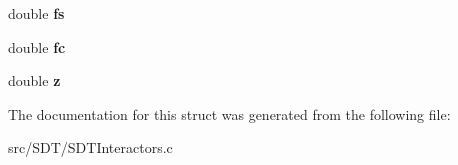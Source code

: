 \begin{DoxyCompactItemize}
\item 
\hypertarget{struct_s_d_t_friction_ac0c69854be0f25918d8cfaaa932feda9}{}double {\bfseries fs}\label{struct_s_d_t_friction_ac0c69854be0f25918d8cfaaa932feda9}

\item 
\hypertarget{struct_s_d_t_friction_a689f18157c425f52c5028d408c365616}{}double {\bfseries fc}\label{struct_s_d_t_friction_a689f18157c425f52c5028d408c365616}

\item 
\hypertarget{struct_s_d_t_friction_ab3e6ed577a7c669c19de1f9c1b46c872}{}double {\bfseries z}\label{struct_s_d_t_friction_ab3e6ed577a7c669c19de1f9c1b46c872}

\end{DoxyCompactItemize}


The documentation for this struct was generated from the following file\+:\begin{DoxyCompactItemize}
\item 
src/\+S\+D\+T/S\+D\+T\+Interactors.\+c\end{DoxyCompactItemize}
